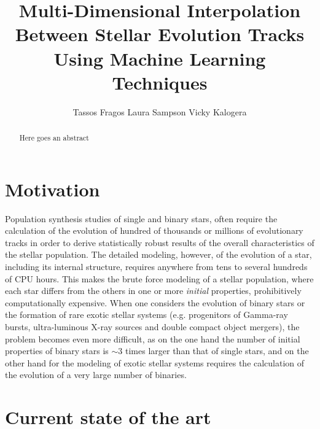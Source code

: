 \documentclass[preprint]{aastex}
\title{Multi-Dimensional Interpolation Between Stellar Evolution Tracks Using
Machine Learning Techniques}
\author{Tassos Fragos\affil{University of Geneva} Laura Sampson\affil{Northwestern University}  Vicky Kalogera\affil{Northwestern University}}
\begin{document}
\maketitle


\begin{abstract}

Here goes an abstract

\end{abstract}
    

\section{Motivation}
    
Population synthesis studies of single and binary stars, often require the calculation of the evolution of hundred of thousands or millions of evolutionary tracks in order to derive statistically robust results of the overall characteristics of the stellar population. The detailed modeling, however, of the evolution of a star, including its internal structure, requires anywhere from tens to several hundreds of CPU hours. This makes the brute force modeling of a stellar population, where each star differs from the others in one or more \textit{initial} properties, prohibitively computationally expensive. When one considers the evolution of binary stars or the formation of rare exotic stellar systems (e.g. progenitors of Gamma-ray bursts, ultra-luminous X-ray sources and double compact object mergers), the problem becomes even more difficult, as on the one hand the number of initial properties of binary stars is $\sim 3$ times larger than that of single stars, and on the other hand for the modeling of exotic stellar systems requires the calculation of the evolution of a very large number of binaries.
    
    
    
    
    

\section{Current state of the art}
\end{document}
